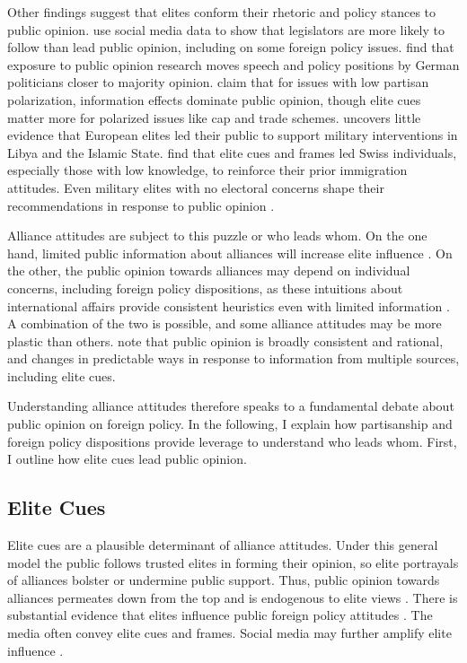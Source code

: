 \documentclass[12pt]{article}
\begin{document}
Other findings suggest that elites conform their rhetoric and policy stances to public opinion. 
\citet{Barberaetal2019} use social media data to show that legislators are more likely to follow than lead public opinion, including on some foreign policy issues. 
\citet{HagerHilbig2020} find that exposure to public opinion research moves speech and policy positions by German politicians closer to majority opinion. 
\citet{GuisingerSaunders2017} claim that for issues with low partisan polarization, information effects dominate public opinion, though elite cues matter more for polarized issues like cap and trade schemes. 
\citet{Haesebrouck2019} uncovers little evidence that European elites led their public to support military interventions in Libya and the Islamic State. 
\citet{Bechteletal2015} find that elite cues and frames led Swiss individuals, especially those with low knowledge, to reinforce their prior immigration attitudes. 
Even military elites with no electoral concerns shape their recommendations in response to public opinion \citep{LinGreenberg2021}. 



Alliance attitudes are subject to this puzzle or who leads whom. 
On the one hand, limited public information about alliances will increase elite influence \citep{Druckman2001}. 
On the other, the public opinion towards alliances may depend on individual concerns, including foreign policy dispositions, as these intuitions about international affairs provide consistent heuristics even with limited information \citep{Herrmannetal2009, KertzerZeitzoff2017}.
A combination of the two is possible, and some alliance attitudes may be more plastic than others. 
\citet{PageShapiro1992} note that public opinion is broadly consistent and rational, and changes in predictable ways in response to information from multiple sources, including elite cues. 


Understanding alliance attitudes therefore speaks to a fundamental debate about public opinion on foreign policy.  
In the following, I explain how partisanship and foreign policy dispositions provide leverage to understand who leads whom.
First, I outline how elite cues lead public opinion. 


\subsection{Elite Cues} 

Elite cues are a plausible determinant of alliance attitudes. 
Under this general model the public follows trusted elites in forming their opinion, so elite portrayals of alliances bolster or undermine public support.
Thus, public opinion towards alliances permeates down from the top and is endogenous to elite views \citep{Druckman2014}.
There is substantial evidence that elites influence public foreign policy attitudes \citep{BaumPotter2008}. 
The media often convey elite cues and frames.
Social media may further amplify elite influence \citep{BaumPotter2019}.   
\end{document}
